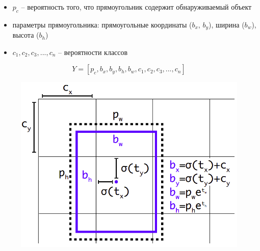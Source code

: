 \begin{itemize}
	\item $p_c$ -- вероятность того, что прямоугольник содержит обнаруживаемый объект
	\item параметры прямоугольника: прямоугольные координаты ($b_x$, $b_y$), ширина ($b_w$), высота ($b_h$)
	\item $c_1, c_2, c_3, ..., c_n$ -- вероятности классов
\end{itemize}

\begin{equation}
Y = [p_c, b_x, b_y, b_h, b_w, c_1, c_2, c_3, ..., c_n]
\label{eqn:output_vector}
\end{equation}

\begin{figure}
	\centering
	\includegraphics[width=0.7\linewidth]{images/bounding-boxes}
	\caption{}
	\label{fig:bounding-boxes}
\end{figure}


%
%


